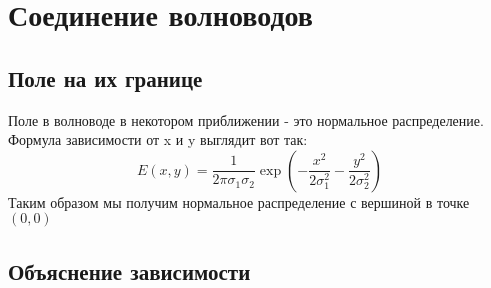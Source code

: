 \chapter{Соединение волноводов}
\section{Поле на их границе}
Поле в волноводе в некотором приближении - это нормальное распределение. Формула зависимости от x и y 
выглядит вот так:
\begin{equation}
  \label{gauss2d}
  E(x,y)=\frac{1}{2\pi\sigma_1\sigma_2}\exp\left(-\frac{x^2}{2\sigma_1^2}-\frac{y^2}{2\sigma_2^2}\right)
\end{equation}
Таким образом мы получим нормальное распределение с вершиной в точке $(0,0)$
\section{Объяснение зависимости}

